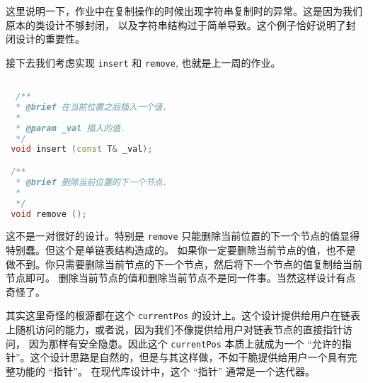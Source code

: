 \documentclass[a4paper]{ctexart}
\theoremstyle{definition}
\theoremstyle{definition}
\begin{document}



这里说明一下，作业中在复制操作的时候出现字符串复制时的异常。这是因为我们原本的类设计不够封闭，
以及字符串结构过于简单导致。这个例子恰好说明了封闭设计的重要性。

接下去我们考虑实现 \verb|insert| 和 \verb|remove|, 也就是上一周的作业。

\begin{lstlisting}[language=C++]

  /**
  * @brief 在当前位置之后插入一个值.
  * 
  * @param _val 插入的值.
  */
 void insert (const T& _val);

 /**
  * @brief 删除当前位置的下一个节点.
  * 
  */
 void remove ();

\end{lstlisting}

这不是一对很好的设计。特别是 \verb|remove| 只能删除当前位置的下一个节点的值显得特别蠢。但这个是单链表结构造成的。
如果你一定要删除当前节点的值，也不是做不到。你只需要删除当前节点的下一个节点，然后将下一个节点的值复制给当前节点即可。
删除当前节点的值和删除当前节点不是同一件事。当然这样设计有点奇怪了。

其实这里奇怪的根源都在这个 \verb|currentPos| 的设计上。这个设计提供给用户在链表上随机访问的能力，或者说，因为我们不像提供给用户对链表节点的直接指针访问，
因为那样有安全隐患。因此这个 \verb|currentPos| 本质上就成为一个 ``允许的指针''。这个设计思路是自然的，但是与其这样做，不如干脆提供给用户一个具有完整功能的 ``指针''。
在现代库设计中，这个 ``指针'' 通常是一个迭代器。
\end{document}
